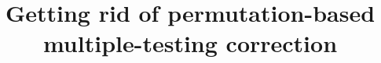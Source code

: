 \documentclass{bmcart}
\begin{document}
\begin{frontmatter}

\begin{fmbox}


\title{Getting rid of permutation-based multiple-testing correction}


\author[
   addressref={aff1,aff2},                   %
   corref={aff1},                       %
   email={F.VanLishout@ulg.ac.be}   %
]{ }
\author[
   addressref={aff1,aff2},
   email={Francesco.Gadaleta@ulg.ac.be}
]{ }
\author[
   addressref={aff3},
   email={jason.h.moore@dartmouth.edu}
]{ }
\author[
   addressref={aff1,aff2},
   email={L.Wehenkel@ulg.ac.be}
]{ }
\author[
   addressref={aff1,aff2},
   email={kristel.vansteen@ulg.ac.be}
]{ }



\end{fmbox}
\end{frontmatter}
\end{document}
